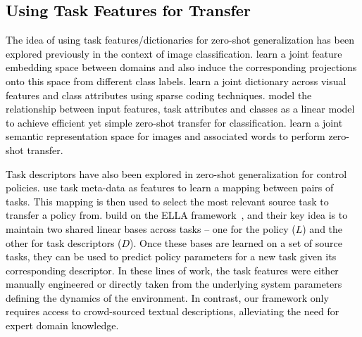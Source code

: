 \textcolor{black}{
\subsection{Using Task Features for Transfer}
The idea of using task features/dictionaries for zero-shot generalization has been explored previously in the context of image classification.  learn a joint feature embedding space between domains and also induce the corresponding projections onto this space from different class labels. 
 learn a joint dictionary across visual features and class attributes using sparse coding techniques.  model the relationship between input features, task attributes and classes as a linear model to achieve efficient yet simple zero-shot transfer for classification.  learn a joint semantic representation space for images and associated words to perform zero-shot transfer.}

\textcolor{black}{
Task descriptors have also been explored in zero-shot generalization for control policies.  use task meta-data as features to learn a mapping between pairs of tasks. This mapping is then used to select the most relevant source task to transfer a policy from.  build on the ELLA framework~, and their key idea is to maintain two shared linear bases across tasks -- one for the policy ($L$) and the other for task descriptors ($D$). Once these bases are learned on a set of source tasks, they can be used to predict policy parameters for a new task given its corresponding descriptor. 
In these lines of work, the task features were either manually engineered or directly taken from the underlying system parameters defining the dynamics of the environment. In contrast, our framework only requires access to crowd-sourced textual descriptions, alleviating the need for expert domain knowledge.}













